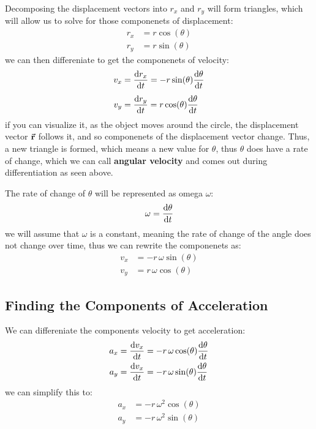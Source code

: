 \documentclass{article}
\begin{document}
Decomposing the displacement vectors into $r_x$ and $r_y$ will form triangles, which will allow
us to solve for those componenets of displacement:
\begin{align*}
    r_x &= r\cos(\theta) \\
    r_y &= r\sin(\theta)
\end{align*}
we can then differeniate to get the componenets of velocity:
\begin{align*}
    v_x &= \derivative{r_x}{t} = -r\sin(\theta) \derivative{\theta}{t} \\[1ex]
    v_y &= \derivative{r_y}{t} = r\cos(\theta) \derivative{\theta}{t}
\end{align*}
if you can visualize it, as the object moves around the circle, the displacement vector
$\va{r}$ follows it, and so componenets of the displacement vector change. Thus, a new 
triangle is formed, which means a new value for $\theta$, thus $\theta$ does have a rate 
of change, which we can call \textbf{angular velocity} and comes out during differentiation 
as seen above.

The rate of change of $\theta$ will be represented as omega $\omega$:
\[ \omega = \derivative{\theta}{t} \]
we will assume that $\omega$ is a constant, meaning the 
rate of change of the angle does not change over time,
thus we can rewrite the componenets as:
\begin{align*}
    v_x &= -r \, \omega \sin(\theta) \\[1ex]
    v_y &= r \, \omega \cos(\theta)
\end{align*}

\subsection{Finding the Components of Acceleration}
We can differeniate the components velocity to get acceleration:
\begin{align*}
    a_x &= \derivative{v_x}{t} = -r \, \omega \cos(\theta) \derivative{\theta}{t} \\
    a_y &= \derivative{v_x}{t} = -r \, \omega \sin(\theta) \derivative{\theta}{t}
\end{align*}
we can simplify this to:
\begin{align*}
    a_x &= -r \, \omega^2 \cos(\theta) \\
    a_y &= -r \, \omega^2 \sin(\theta)
\end{align*}
\end{document}
